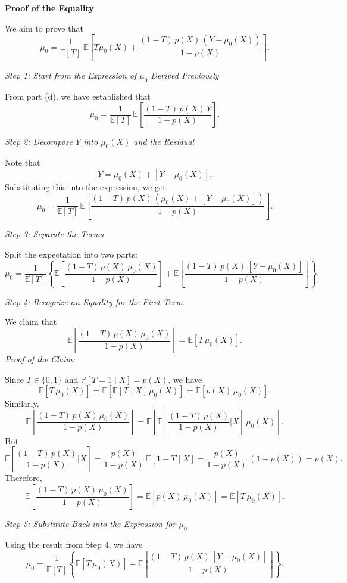 \documentclass{article}
\begin{document}
\textbf{Proof of the Equality}

We aim to prove that
\[
\mu_0 = \frac{1}{\mathbb{E}[T]} \, \mathbb{E} \left[ T \mu_0(X) + \frac{(1 - T) \, p(X) \, (Y - \mu_0(X))}{1 - p(X)} \right].
\]

\textit{Step 1: Start from the Expression of \(\mu_0\) Derived Previously}

From part (d), we have established that
\[
\mu_0 = \frac{1}{\mathbb{E}[T]} \, \mathbb{E}\left[ \frac{(1 - T) \, p(X) \, Y}{1 - p(X)} \right].
\]

\textit{Step 2: Decompose \(Y\) into \(\mu_0(X)\) and the Residual}

Note that
\[
Y = \mu_0(X) + [Y - \mu_0(X)].
\]
Substituting this into the expression, we get
\[
\mu_0 = \frac{1}{\mathbb{E}[T]} \, \mathbb{E}\left[ \frac{(1 - T) \, p(X) \, \left( \mu_0(X) + [Y - \mu_0(X)] \right)}{1 - p(X)} \right].
\]

\textit{Step 3: Separate the Terms}

Split the expectation into two parts:
\[
\mu_0 = \frac{1}{\mathbb{E}[T]} \left\{ \mathbb{E}\left[ \frac{(1 - T) \, p(X) \, \mu_0(X)}{1 - p(X)} \right] + \mathbb{E}\left[ \frac{(1 - T) \, p(X) \, [Y - \mu_0(X)]}{1 - p(X)} \right] \right\}.
\]

\textit{Step 4: Recognize an Equality for the First Term}

We claim that
\[
\mathbb{E}\left[ \frac{(1 - T) \, p(X) \, \mu_0(X)}{1 - p(X)} \right] = \mathbb{E}[T \, \mu_0(X)].
\]
\textit{Proof of the Claim:}

Since \( T \in \{0,1\} \) and \( \mathbb{P}[T = 1 \mid X] = p(X) \), we have
\[
\mathbb{E}[T \, \mu_0(X)] = \mathbb{E}\left[ \mathbb{E}[T \mid X] \, \mu_0(X) \right] = \mathbb{E}[ p(X) \, \mu_0(X) ].
\]
Similarly,
\[
\mathbb{E}\left[ \frac{(1 - T) \, p(X) \, \mu_0(X)}{1 - p(X)} \right] = \mathbb{E}\left[ \mathbb{E}\left[ \frac{(1 - T) \, p(X)}{1 - p(X)} \Big| X \right] \, \mu_0(X) \right].
\]
But
\[
\mathbb{E}\left[ \frac{(1 - T) \, p(X)}{1 - p(X)} \Big| X \right] = \frac{p(X)}{1 - p(X)} \, \mathbb{E}[1 - T \mid X] = \frac{p(X)}{1 - p(X)} \, (1 - p(X)) = p(X).
\]
Therefore,
\[
\mathbb{E}\left[ \frac{(1 - T) \, p(X) \, \mu_0(X)}{1 - p(X)} \right] = \mathbb{E}[ p(X) \, \mu_0(X) ] = \mathbb{E}[T \, \mu_0(X)].
\]

\textit{Step 5: Substitute Back into the Expression for \(\mu_0\)}

Using the result from Step 4, we have
\[
\mu_0 = \frac{1}{\mathbb{E}[T]} \left\{ \mathbb{E}[T \, \mu_0(X)] + \mathbb{E}\left[ \frac{(1 - T) \, p(X) \, [Y - \mu_0(X)]}{1 - p(X)} \right] \right\}.
\]
\end{document}
